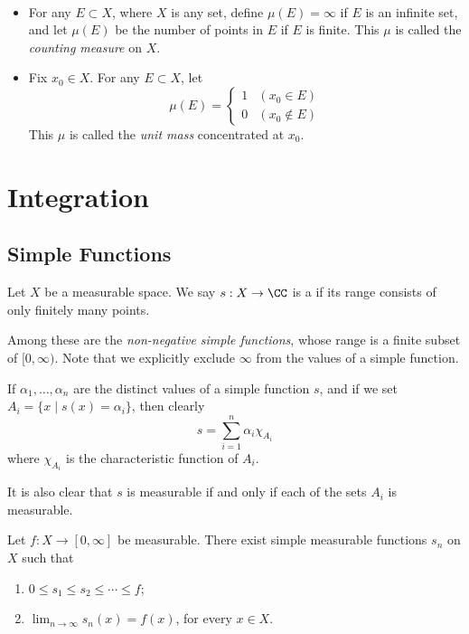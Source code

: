 \begin{example} \
\begin{itemize}
\item For any $E\subset X$, where $X$ is any set, define $\mu(E)=\infty$ if $E$ is an infinite set, and let $\mu(E)$ be the number of points in $E$ if $E$ is finite. This $\mu$ is called the \emph{counting measure} on $X$. 
\item Fix $x_0\in X$. For any $E\subset X$, let
\[\mu(E)=\begin{cases}
1&(x_0\in E)\\
0&(x_0\notin E)
\end{cases}\]
This $\mu$ is called the \emph{unit mass} concentrated at $x_0$.
\end{itemize}
\end{example}
\pagebreak

\section{Integration}
\subsection{Simple Functions}
\begin{definition}
Let $X$ be a measurable space. We say $s:X\to\CC$ is a  if its range consists of only finitely many points. 
\end{definition}

Among these are the \emph{non-negative simple functions}, whose range is a finite subset of $[0,\infty)$. Note that we explicitly exclude $\infty$ from the values of a simple function.

If $\alpha_1,\dots,\alpha_n$ are the distinct values of a simple function $s$, and if we set $A_i=\{x\mid s(x)=\alpha_i\}$, then clearly
\[s=\sum_{i=1}^{n}\alpha_i\chi_{A_i}\]
where $\chi_{A_i}$ is the characteristic function of $A_i$.

It is also clear that $s$ is measurable if and only if each of the sets $A_i$ is measurable.

\begin{proposition}
Let $f\colon X\to[0,\infty]$ be measurable. There exist simple measurable functions $s_n$ on $X$ such that
\begin{enumerate}[label=(\roman*)]
\item $0\le s_1\le s_2\le\cdots\le f$;
\item $\displaystyle\lim_{n\to\infty}s_n(x)=f(x)$, for every $x\in X$.
\end{enumerate}
\end{proposition}
\pagebreak

